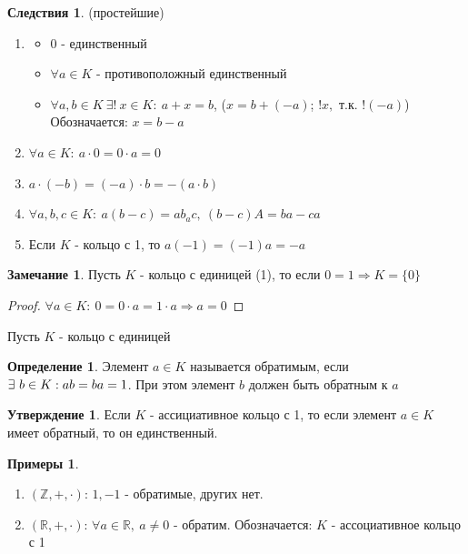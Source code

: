 \documentclass[a4paper, 12pt]{article}
\newcommand{\R}{\mathbb R}
\newcommand{\Z}{\mathbb Z}
\newcommand\tab[1][.5cm]{\hspace*{#1}}
\theoremstyle{definition}
\newtheorem*{definition}{Определение}
\newtheorem*{consequenses}{Следствия}
\newtheorem*{subtheorem}{Утверждение}
\newtheorem*{remark}{Замечание}
\newtheorem*{example}{Примеры}
\begin{document}
  \begin{consequenses} (простейшие)
    \begin{enumerate}
      \item \begin{itemize}
        \item $0$ - единственный
        \item $\forall a\in K$ - противоположный единственный
        \item $\forall a, b\in K \ \exists! \ x \in K: \ a+x=b$, ($x = b+(-a)$; $!x,$ т.к. $!(-a)$)   
        Обозначается: $x = b-a$ 
      \end{itemize}
      \item $\forall a \in K: \ a \cdot 0=0 \cdot a = 0$
      \item $a\cdot(-b) = (-a)\cdot b = -(a\cdot b)$  
      \item $\forall a, b, c \in K: \ a(b-c) = ab_ac, \ (b-c)A = ba-ca$ 
      \item Если $K$ - кольцо с 1, то $a(-1) = (-1)a = -a$ 
    \end{enumerate}
  \end{consequenses}
  \begin{remark}
    Пусть $K$ - кольцо с единицей (1), то если $0 = 1 \Longrightarrow K = \{0\}$ 
  \end{remark}
  \begin{proof}
    $\forall a \in K: \ 0 = 0 \cdot a= 1 \cdot a \Longrightarrow a = 0$ 
  \end{proof} 
  Пусть $K$ - кольцо с единицей 
  \begin{definition}
      Элемент $a \in K$ называется обратимым, если $\exists \ b \in K: \\ab =ba = 1$. При этом элемент $b$ должен быть обратным к $a$   
  \end{definition}  
  \begin{subtheorem}
    Если $K$ - ассициативное кольцо с 1, то если элемент $a \in K$ имеет обратный, то он единственный.  
  \end{subtheorem} 
  \begin{example} \tab
    \begin{enumerate}
      \item $(\Z, +, \cdot)$:  $1, -1$ - обратимые, других нет.
      \item $(\R, +, \cdot)$: $\forall a \in \R, \ a \neq 0$ - обратим.
      Обозначается: $K$ - ассоциативное кольцо с 1  
    \end{enumerate}
  \end{example}
\end{document}
